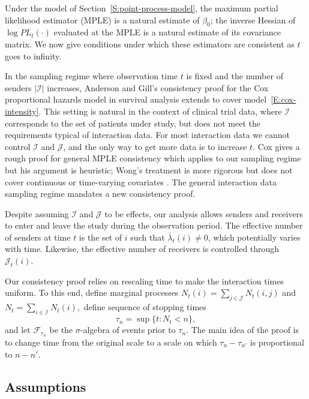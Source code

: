 \documentclass[aoas,preprint]{imsart}
\begin{document}
Under the model of Section~\ref{S:point-process-model}, the maximum partial likelihood estimator (MPLE) is a natural
estimate of $\beta_0$; the inverse Hessian of $\log \mathit{PL}_t(\cdot)$
evaluated at the MPLE is a natural estimate of its covariance matrix.
We now give conditions under which these
estimators are consistent as $t$ goes to infinity.

In the sampling regime where observation time $t$ is fixed and the number of 
senders $|\mathcal{I}|$ increases, Anderson and Gill's consistency proof for
the Cox proportional hazards model in survival analysis extends
to cover model~\eqref{E:cox-intensity}.  This setting is natural in the 
context of clinical trial data, where $\mathcal{I}$ corresponds to the set of 
patients under study, but does not meet the requirements typical of 
interaction data.  For most interaction 
data we cannot control $\mathcal{I}$ and $\mathcal{J}$, and the only way to 
get more data is to increase $t$.  Cox gives a rough proof for general
MPLE consistency which applies to our sampling regime but his argument is 
heuristic; Wong's treatment is more rigorous but does not cover continuous or 
time-varying covariates \cite{cox1975partial,wong1986theory}. The general 
interaction data sampling regime mandates a new consistency proof.

Despite assuming $\mathcal{I}$ and $\mathcal{J}$ to be effects, our analysis 
allows senders and receivers to enter and leave the study during the 
observation period.  The effective number of senders at time $t$ is the
set of $i$ such that $\bar \lambda_t(i) \neq 0$, which potentially varies
with time.  Likewise, the effective number of receivers is controlled through
$\mathcal{J}_t(i)$.

Our consistency proof relies on rescaling time to make the interaction 
times uniform.  To this end, define marginal processes
\(
    N_t(i) = \sum_{j \in \mathcal{J}} N_t(i,j)
\)
and
\(
    N_t = \sum_{i \in \mathcal{I}} N_t(i),
\)
define sequence of stopping times
\begin{equation}\label{E:message-times}
    \tau_n = \sup\{ t : N_t < n \},
\end{equation}
and let $\mathcal{F}_{\tau_n}$ be the $\sigma$-algebra of events prior to
$\tau_n$. The main idea of the proof is to change time from the original scale 
to a scale on which $\tau_{n} - \tau_{n'}$ is proportional to $n - n'$.

\subsection{Assumptions}
\end{document}
